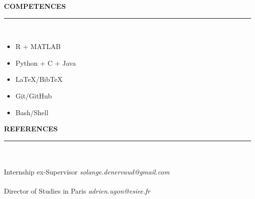 \documentclass[9pt,a4paper]{article}
\newcommand{\myline}[1]{\rule{#1}{1.0pt}\\}
\newcommand{\topic}[1]{\textbf{\Large\selectfont\MakeUppercase{#1}}\\\vspace{-1em}\myline{1.0cm}}
\newcommand{\subtopic}[1]{\textbf{\normalsize\selectfont{#1}}\\}
\begin{document}
\begin{minipage}[c]{0.3\linewidth}
\begin{flushleft}
\vspace{1em}
\topic{Competences}
\vspace{-1em} 
\begin{itemize}%
    \setlength\itemsep{-0.5em}
    \item R + MATLAB
    \item Python + C + Java
    \item LaTeX/BibTeX
    \item Git/GitHub
    \item Bash/Shell
\end{itemize}

\topic{References}
\subtopic{Solange DENERVAUD}
Internship ex-Supervisor
\textit{solange.denervaud@gmail.com}\\
\subtopic{Adrien UGON}
Director of Studies in Paris
\textit{adrien.ugon@esiee.fr}
\end{flushleft}
\end{minipage} %
\end{document}
